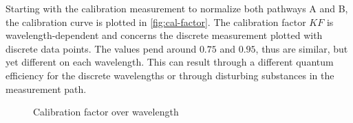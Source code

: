 
Starting with the calibration measurement to normalize both pathways A and B, the calibration curve is plotted in \autoref{fig:cal-factor}. The calibration factor $KF$ is wavelength-dependent and concerns the discrete measurement plotted with discrete data points. The values pend around $0.75$ and $0.95$, thus are similar, but yet different on each wavelength. This can result through a different quantum efficiency for the discrete wavelengths or through disturbing substances in the measurement path.

\begin{figure}[!htb]
    \centering
    
    \caption{Calibration factor over wavelength}
    \label{fig:cal-factor}
\end{figure}


